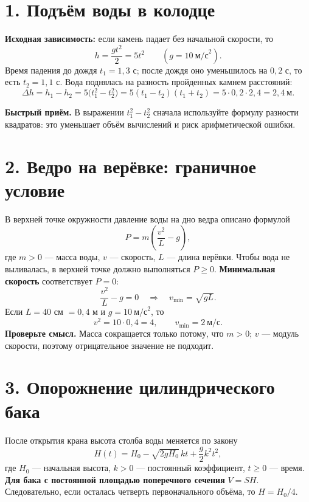 \documentclass[a4paper,12pt]{article}
\newcommand{\important}[1]{\textcolor{deepaccent}{\textbf{#1}}}
\newcommand{\method}[1]{\medskip\noindent\textcolor{deepaccent}{\textbf{#1}}\quad}
\newcommand{\sectiontitle}[1]{\needspace{6\baselineskip}\section*{\color{deepaccent}#1}}
\begin{document}
\sectiontitle{1. Подъём воды в колодце}
\important{Исходная зависимость:} если камень падает без начальной скорости, то
\[
  h=\frac{gt^2}{2}=5t^2\qquad (g=10\ \text{м/с}^2).
\]
Время падения до дождя \(t_1=1{,}3\) с; после дождя оно уменьшилось на \(0{,}2\) с, то есть \(t_2=1{,}1\) с. Вода поднялась на разность пройденных камнем расстояний:
\[
\Delta h=h_1-h_2=5\bigl(t_1^2-t_2^2\bigr)
=5(t_1-t_2)(t_1+t_2)=5\cdot0{,}2\cdot2{,}4=\boxed{2{,}4\ \text{м}}.
\]
\begin{center}
\end{center}
\method{Быстрый приём.} В выражении \(t_1^2-t_2^2\) сначала используйте формулу разности квадратов: это уменьшает объём вычислений и риск арифметической ошибки.

\sectiontitle{2. Ведро на верёвке: граничное условие}
В верхней точке окружности давление воды на дно ведра описано формулой
\[
P=m\left(\frac{v^2}{L}-g\right),
\]
где \(m>0\) --- масса воды, \(v\) --- скорость, \(L\) --- длина верёвки. Чтобы вода не выливалась, в верхней точке должно выполняться \(P\ge0\). \important{Минимальная скорость} соответствует \(P=0\):
\[
\frac{v^2}{L}-g=0\quad\Longrightarrow\quad
v_{\min}=\sqrt{gL}.
\]
Если \(L=40\) см \(=0{,}4\) м и \(g=10\ \text{м/с}^2\), то
\[
v^2=10\cdot0{,}4=4,\qquad v_{\min}=\boxed{2\ \text{м/с}}.
\]
\method{Проверьте смысл.} Масса сокращается только потому, что \(m>0\); \(v\) --- модуль скорости, поэтому отрицательное значение не подходит.

\sectiontitle{3. Опорожнение цилиндрического бака}
После открытия крана высота столба воды меняется по закону
\[
H(t)=H_0-\sqrt{2gH_0}\,kt+\frac{g}{2}k^2t^2,
\]
где \(H_0\) --- начальная высота, \(k>0\) --- постоянный коэффициент, \(t\ge0\) --- время. \important{Для бака с постоянной площадью поперечного сечения} \(V=SH\). Следовательно, если осталась четверть первоначального объёма, то \(H=H_0/4\).
\end{document}
